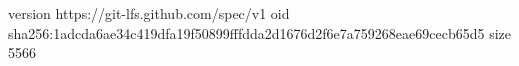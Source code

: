 version https://git-lfs.github.com/spec/v1
oid sha256:1adcda6ae34c419dfa19f50899fffdda2d1676d2f6e7a759268eae69cecb65d5
size 5566
